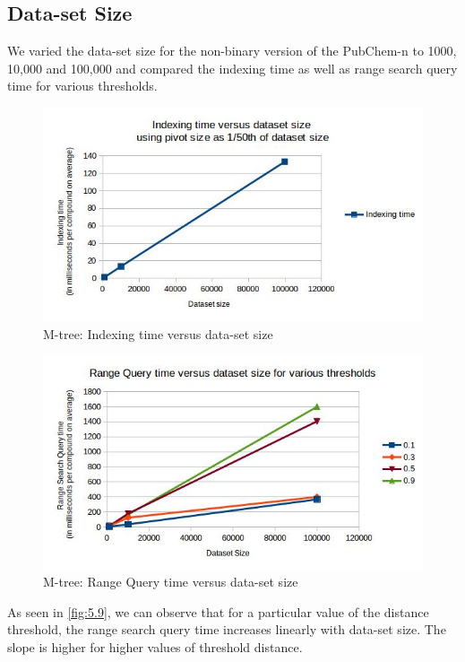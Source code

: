 \subsection{Data-set Size}
We varied the data-set size for the non-binary version of the PubChem-n to 1000, 10,000 and 100,000 and compared the indexing time as well as range search query time for various thresholds. 


\begin{figure}[ht!]	
\centering
\includegraphics[width=1 \columnwidth]{img/image6.jpg}
\caption{M-tree: Indexing time versus data-set size}
\label{fig:5.8}
\end{figure}

\begin{figure}[ht!]	
\centering
\includegraphics[width=1 \columnwidth]{img/image9.jpg}
\caption{M-tree: Range Query time versus data-set size}
\label{fig:5.9}
\end{figure}


As seen in \autoref{fig:5.9}, we can observe that for a particular value of the distance threshold, the range search query time increases linearly with data-set size. The slope is higher for higher values of threshold distance.


